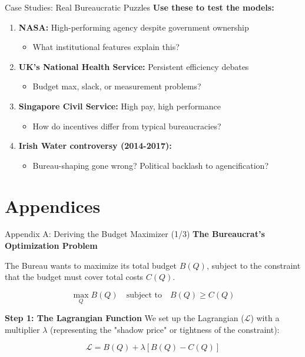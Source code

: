 \documentclass[10pt]{beamer}
\begin{document}
\begin{frame}{Case Studies: Real Bureaucratic Puzzles}
\textbf{Use these to test the models:}

\begin{enumerate}
\item \textbf{NASA:} High-performing agency despite government ownership
\begin{itemize}
\item What institutional features explain this?
\end{itemize}

\item \textbf{UK's National Health Service:} Persistent efficiency debates
\begin{itemize}
\item Budget max, slack, or measurement problems?
\end{itemize}

\item \textbf{Singapore Civil Service:} High pay, high performance
\begin{itemize}
\item How do incentives differ from typical bureaucracies?
\end{itemize}

\item \textbf{Irish Water controversy (2014-2017):}
\begin{itemize}
\item Bureau-shaping gone wrong? Political backlash to agencification?
\end{itemize}
\end{enumerate}
\end{frame}

\section*{Appendices}

\begin{frame}{Appendix A: Deriving the Budget Maximizer (1/3)}
\textbf{The Bureaucrat's Optimization Problem}

The Bureau wants to maximize its total budget $B(Q)$, subject to the constraint that the budget must cover total costs $C(Q)$.

\[
\max_{Q} B(Q) \quad \text{subject to} \quad B(Q) \ge C(Q)
\]

\vspace{0.5cm}

\textbf{Step 1: The Lagrangian Function}
We set up the Lagrangian ($\mathcal{L}$) with a multiplier $\lambda$ (representing the "shadow price" or tightness of the constraint):

\[
\mathcal{L} = B(Q) + \lambda [ B(Q) - C(Q) ]
\]

\end{frame}
\end{document}

